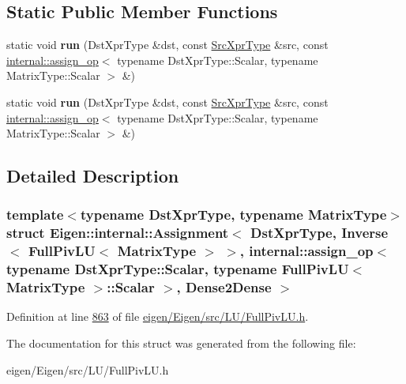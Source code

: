 \subsection*{Static Public Member Functions}
\begin{DoxyCompactItemize}
\item 
\mbox{\label{struct_eigen_1_1internal_1_1_assignment_3_01_dst_xpr_type_00_01_inverse_3_01_full_piv_l_u_3_01_m9a195c884433725cd2990fc22dc66c56_a231169f7021568601b2e13f3e5a6257c}} 
static void {\bfseries run} (Dst\+Xpr\+Type \&dst, const \hyperlink{class_eigen_1_1_inverse}{Src\+Xpr\+Type} \&src, const \hyperlink{struct_eigen_1_1internal_1_1assign__op}{internal\+::assign\+\_\+op}$<$ typename Dst\+Xpr\+Type\+::\+Scalar, typename Matrix\+Type\+::\+Scalar $>$ \&)
\item 
\mbox{\label{struct_eigen_1_1internal_1_1_assignment_3_01_dst_xpr_type_00_01_inverse_3_01_full_piv_l_u_3_01_m9a195c884433725cd2990fc22dc66c56_a231169f7021568601b2e13f3e5a6257c}} 
static void {\bfseries run} (Dst\+Xpr\+Type \&dst, const \hyperlink{class_eigen_1_1_inverse}{Src\+Xpr\+Type} \&src, const \hyperlink{struct_eigen_1_1internal_1_1assign__op}{internal\+::assign\+\_\+op}$<$ typename Dst\+Xpr\+Type\+::\+Scalar, typename Matrix\+Type\+::\+Scalar $>$ \&)
\end{DoxyCompactItemize}


\subsection{Detailed Description}
\subsubsection*{template$<$typename Dst\+Xpr\+Type, typename Matrix\+Type$>$\newline
struct Eigen\+::internal\+::\+Assignment$<$ Dst\+Xpr\+Type, Inverse$<$ Full\+Piv\+L\+U$<$ Matrix\+Type $>$ $>$, internal\+::assign\+\_\+op$<$ typename Dst\+Xpr\+Type\+::\+Scalar, typename Full\+Piv\+L\+U$<$ Matrix\+Type $>$\+::\+Scalar $>$, Dense2\+Dense $>$}



Definition at line \hyperlink{eigen_2_eigen_2src_2_l_u_2_full_piv_l_u_8h_source_l00863}{863} of file \hyperlink{eigen_2_eigen_2src_2_l_u_2_full_piv_l_u_8h_source}{eigen/\+Eigen/src/\+L\+U/\+Full\+Piv\+L\+U.\+h}.



The documentation for this struct was generated from the following file\+:\begin{DoxyCompactItemize}
\item 
eigen/\+Eigen/src/\+L\+U/\+Full\+Piv\+L\+U.\+h\end{DoxyCompactItemize}
